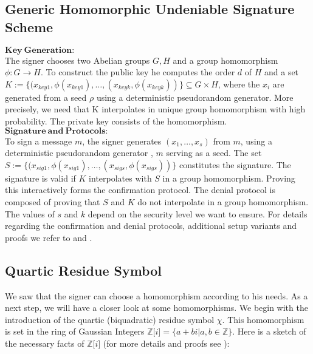 \documentclass[a4paper, 11pt]{article}
\begin{document}
 \subsection{Generic Homomorphic Undeniable Signature Scheme} 
 $\mathbf{Key ~Generation:}$\\ 
 The signer chooses two Abelian groups $G, H$ and a group homomorphism $\phi : G \to H$. 
 To construct the public key he computes the order $d$ of $H$ and a set $K := \{(x_{key1},\phi(x_{key1}),\ldots,(x_{keyk},\phi(x_{keyk}))\} \subseteq G \times H$, where  the $x_{i}$ are generated from a seed $\rho$ using a deterministic pseudorandom generator. More precisely, we need that K interpolates in unique group homomorphism with high probability. The private key consists of the homomorphism.\\ 
 
 $\mathbf{Signature ~and ~Protocols:}$\\ 
 To sign a message $m$, the signer generates $(x_1, \ldots, x_s)$ from $m$, using a deterministic pseudorandom generator , $m$ serving as a seed. The set 
 $S:= \{(x_{sig1},\phi(x_{sig1}),\ldots,(x_{sigs},\phi(x_{sigs}))\}$ constitutes the signature. 
 The signature is valid if $K$ interpolates with $S$ in a group homomorphism. 
 Proving this interactively forms the confirmation protocol. The denial protocol is composed of proving that $S$ and $K$ do not interpolate in a group homomorphism.\\ 
 
 The values of $s$ and $k$ depend on the security level we want to ensure.
 For details regarding the confirmation and denial protocols, additional setup variants and proofs we refer to \cite{howMOVA} 
 and \cite{genMOVA}. 
 
 \subsection{Quartic Residue Symbol} 
 We saw that the signer can choose a homomorphism according to his needs. As a next step, we will have a closer look at some homomorphisms. We begin with the introduction of the quartic (biquadratic) 
 residue symbol $\chi$. This homomorphism is set in the ring of Gaussian Integers $\mathbb{Z}\bigl[{i}\bigr]=\{a + bi|a,b \in 
 \mathbb{Z}\}$. Here is a sketch of the necessary facts of $\mathbb{Z}\bigl[{i}\bigr]$ 
 (for more details and proofs see \cite{rosen}): 
 
\end{document}
